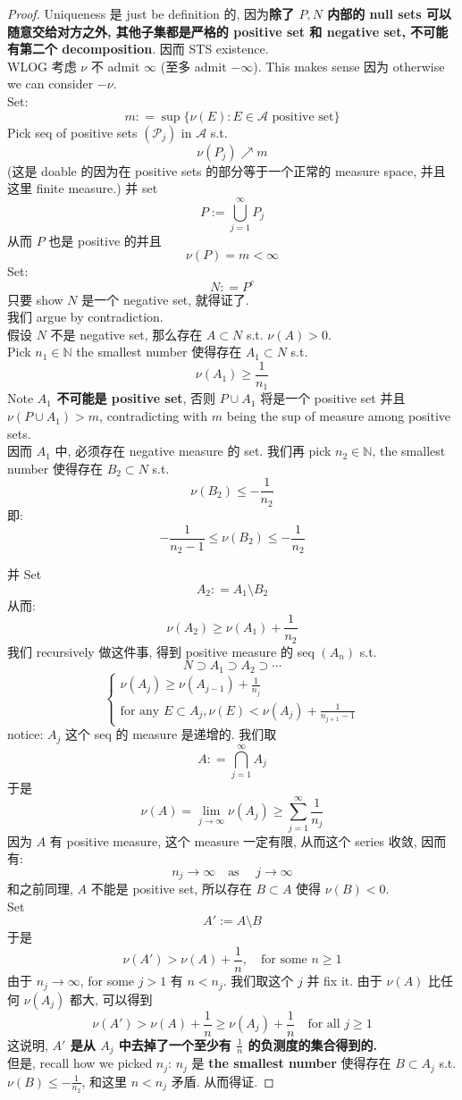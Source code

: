 \documentclass[lang=cn,11pt]{elegantbook}
\begin{document}
\begin{proof}
    Uniqueness 是 just be definition 的, 因为\textbf{除了 $P, N$ 内部的 null sets 可以随意交给对方之外, 其他子集都是严格的 positive set 和 negative set, 不可能有第二个 decomposition}. 因而 STS existence.\\
    WLOG 考虑 $\nu$ 不 admit $\infty$ (至多 admit $-\infty$). This makes sense 因为 otherwise we can consider $-\nu$.\\
    Set: \[
    m : = \sup \{ \nu(E) : E \in \mathcal{A} \text{ positive set}\}
    \]
    Pick seq of positive sets $ (\mathcal{P}_j)$ in $\mathcal{A}$ s.t. \[
    \nu (P_j) \nearrow m
    \]
   (这是 doable 的因为在 positive sets 的部分等于一个正常的 measure space, 并且这里 finite measure.) 
    并 set \[
    P:= \bigcup_{j=1}^\infty P_j
    \]从而 $P$ 也是 positive 的并且 \[
    \nu(P) = m < \infty
    \]
Set: \[
N : = P^c
\]
只要 show $N$ 是一个 negative set, 就得证了.\\
我们 argue by contradiction.\\
假设 $N$ 不是 negative set, 那么存在 $A \subset N$ s.t. $\nu(A) > 0$.\\
Pick $n_1 \in \mathbb{N}$ the smallest number 使得存在 $A_1 \subset N$ s.t. \[
\nu(A_1) \geq \frac{1}{n_1}
\]
Note \textbf{$A_1$ 不可能是 positive set}, 否则 $P\cup A_1$ 将是一个 positive set 并且 $\nu(P \cup A_1) > m$, contradicting with $m$ being the sup of measure among positive sets.\\
因而 $A_1$ 中, 必须存在 negative measure 的 set. 我们再 pick $n_2 \in \mathbb{N}$, the smallest number 使得存在 $B_2 \subset N$ s.t.  \[
\nu(B_2) \leq -\frac{1}{n_2}
\]
即: \[
 -\frac{1}{n_2 - 1} \leq \nu(B_2) \leq -\frac{1}{n_2}
\]

并 Set \[
A_2 : = A_1 \setminus B_2
\]从而: \[
\nu(A_2) \geq \nu(A_1) + \frac{1}{n_2}
\]
我们 recursively 做这件事, 得到 positive measure 的 seq $(A_n)$ s.t. \[
N \supset A_1 \supset A_2 \supset \cdots
\]
\[
\begin{cases}
    \nu(A_j) \geq \nu(A_{j-1}) + \frac{1}{n_j}\\
    \text{for any } E \subset A_{j}, \nu(E) < \nu(A_{j}) + \frac{1}{n_{j+1} - 1}
\end{cases}
\]
notice: $A_j$ 这个 seq 的 measure 是递增的. 我们取 \[
A: = \bigcap_{j=1}^\infty A_j
\]
于是 \[
\nu(A) = \lim_{j\to \infty} \nu(A_j)\geq \sum_{j=1}^\infty \frac{1}{n_j}
\]
因为 $A$ 有 positive measure, 这个 measure 一定有限, 从而这个 series 收敛, 因而有: \[
n_j \to \infty \quad \text{as }\quad j \to \infty
\]
和之前同理, $A$ 不能是 positive set, 所以存在 $B\subset A$ 使得 $\nu(B) < 0$.\\
Set \[
A' := A \setminus B
\]于是 \[
\nu(A')  > \nu(A) + \frac{1}{n}, \quad \text{for some } n \geq 1
\]
由于 $n_j \to \infty$, for some $j>1$ 有 $n < n_j$. 我们取这个 $j$ 并 fix it. 由于 $\nu(A)$ 比任何 $\nu(A_j)$ 都大, 可以得到\[
\nu(A')  > \nu(A) + \frac{1}{n} \geq \nu(A_j) + \frac{1}{n} \quad \text{for all }j\geq 1
\]
这说明,  \textbf{$A'$ 是从 $A_j$ 中去掉了一个至少有 $\frac{1}{n}$ 的负测度的集合得到的.}\\
但是, recall how we picked $n_j$: $n_j$ 是 \textbf{the smallest number} 使得存在 $B \subset A_{j}$ s.t.  $\nu(B) \leq -\frac{1}{n_2}$, 和这里 $n < n_j$ 矛盾. 从而得证.
\end{proof}
\end{document}
